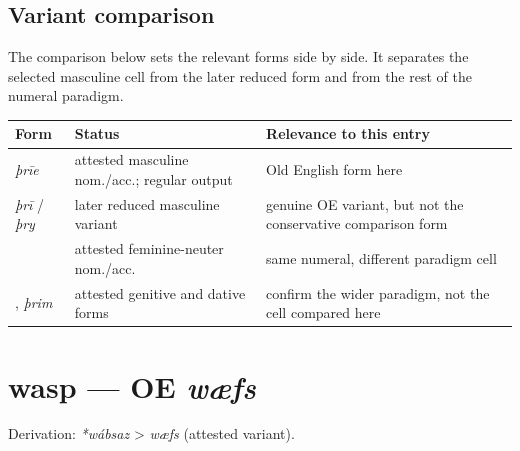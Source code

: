\documentclass[
  british,
  a4paper,
  openany]{book}
\newcounter{none} %
\providecommand{\texorpdfstring}[2]{#1}
\begin{document}
\subsection{Variant comparison}\label{variant-comparison-2}

The comparison below sets the relevant forms side by side. It separates
the selected masculine cell from the later reduced form and from the
rest of the numeral paradigm.

{\def\LTcaptype{none} %
\begin{longtable}[]{@{}
  >{\raggedright\arraybackslash}p{}
  >{\raggedright\arraybackslash}p{}
  >{\raggedright\arraybackslash}p{}@{}}
\toprule\noalign{}
\begin{minipage}[b]{\linewidth}\raggedright
Form
\end{minipage} & \begin{minipage}[b]{\linewidth}\raggedright
Status
\end{minipage} & \begin{minipage}[b]{\linewidth}\raggedright
Relevance to this entry
\end{minipage} \\
\midrule\noalign{}
\endhead
\bottomrule\noalign{}
\endlastfoot
{\emph{þrīe}} & attested masculine nom./acc.; regular output & Old
English form here \\
\emph{þrī} / \emph{þry} & later reduced masculine variant & genuine OE
variant, but not the conservative comparison form \\
{\emph{þrēo}} & attested feminine-neuter nom./acc. & same numeral,
different paradigm cell \\
{\emph{þrēora}}, {\emph{þrim}} & attested genitive and dative forms &
confirm the wider paradigm, not the cell compared here \\
\end{longtable}
}

\section{\texorpdfstring{wasp --- OE
\emph{wæfs}}{wasp --- OE wæfs}}\label{wasp-oe-wuxe6fs}


Derivation: \emph{*wábsaz} \textgreater{} \emph{wæfs} (attested
variant).
\end{document}
